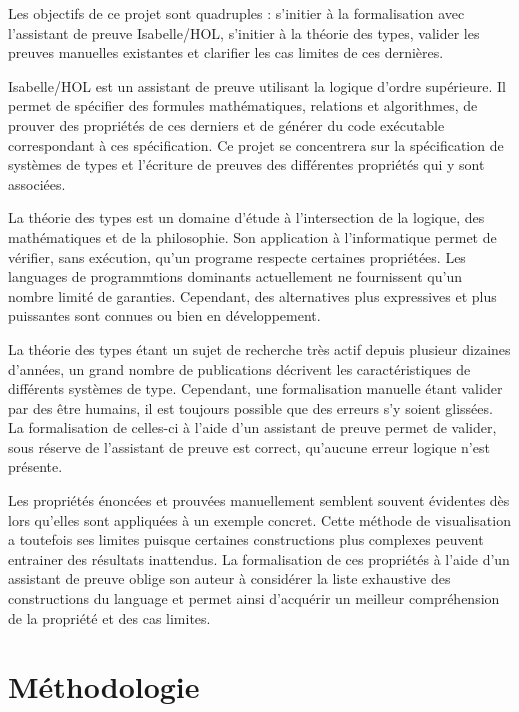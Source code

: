 \documentclass[a4paper, oneside, 12pt, titlepage, draft]{article}
\begin{document}

Les objectifs de ce projet sont quadruples : s'initier à la formalisation avec l'assistant de preuve
Isabelle/HOL, s'initier à la théorie des types, valider les preuves manuelles existantes et
clarifier les cas limites de ces dernières.

Isabelle/HOL est un assistant de preuve utilisant la logique d'ordre supérieure. Il permet de
spécifier des formules mathématiques, relations et algorithmes, de prouver des propriétés de ces
derniers et de générer du code exécutable correspondant à ces spécification. Ce projet se
concentrera sur la spécification de systèmes de types et l'écriture de preuves des différentes
propriétés qui y sont associées.

La théorie des types est un domaine d'étude à l'intersection de la logique, des mathématiques et de
la philosophie. Son application à l'informatique permet de vérifier, sans exécution, qu'un programe
respecte certaines propriétées. Les languages de programmtions dominants actuellement ne fournissent
qu'un nombre limité de garanties. Cependant, des alternatives plus expressives et plus puissantes
sont connues ou bien en développement.

La théorie des types étant un sujet de recherche très actif depuis plusieur dizaines d'années, un
grand nombre de publications décrivent les caractéristiques de différents systèmes de type.
Cependant, une formalisation manuelle étant valider par des être humains, il est toujours possible
que des erreurs s'y soient glissées. La formalisation de celles-ci à l'aide d'un assistant de preuve
permet de valider, sous réserve de l'assistant de preuve est correct, qu'aucune erreur logique n'est
présente.

Les propriétés énoncées et prouvées manuellement semblent souvent évidentes dès lors qu'elles sont
appliquées à un exemple concret. Cette méthode de visualisation a toutefois ses limites puisque
certaines constructions plus complexes peuvent entrainer des résultats inattendus. La formalisation
de ces propriétés à l'aide d'un assistant de preuve oblige son auteur à considérer la liste
exhaustive des constructions du language et permet ainsi d'acquérir un meilleur compréhension de la
propriété et des cas limites.

\section{Méthodologie}
\end{document}
